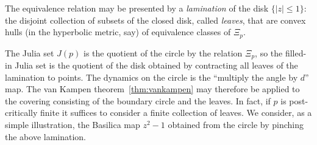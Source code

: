 \documentclass{amsart}
\begin{document}
The equivalence relation may be presented by a \emph{lamination} of
the disk $\{|z|\le1\}$: the disjoint collection of subsets of the
closed disk, called \emph{leaves}, that are convex hulls (in the
hyperbolic metric, say) of equivalence classes of $\Xi_p$. 



\def\myarc#1#2{\path[name path=a] ({#1}:1) -- ($({#1}:1)!10cm!270:(0,0)$);
  \path[name path=b] ({#2}:1) -- ($({#2}:1)!10cm!90:(0,0)$);
  \draw[name intersections={of=a and b,by=t}] (t) let \p1 = ($(t)-({#1}:1)$) in
  circle ({veclen(\x1,\y1)});
}

\begin{center}
\end{center}

The Julia set $J(p)$ is the quotient of the circle by the relation
$\Xi_p$, so the filled-in Julia set is the quotient of the disk
obtained by contracting all leaves of the lamination to points. The
dynamics on the circle is the ``multiply the angle by $d$'' map. The
van Kampen theorem~\ref{thm:vankampen} may therefore be applied to the
covering consisting of the boundary circle and the leaves. In fact, if
$p$ is post-critically finite it suffices to consider a finite
collection of leaves. We consider, as a simple illustration, the
Basilica map $z^2-1$ obtained from the circle by pinching the
above lamination.
\end{document}
